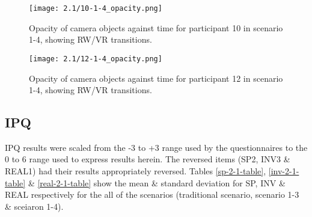 \begin{figure}[h]
	\begin{center}
	\texttt{[image: 2.1/10-1-4\_opacity.png]}
	\caption{Opacity of camera objects against time for participant 10 in scenario 1-4, showing RW/VR transitions.}
	\label{10-1-4_opacity.png}
	\end{center}
\end{figure}

\begin{figure}[h]
	\begin{center}
	\texttt{[image: 2.1/12-1-4\_opacity.png]}
	\caption{Opacity of camera objects against time for participant 12 in scenario 1-4, showing RW/VR transitions.}
	\label{12-1-4_opacity.png}
	\end{center}
\end{figure}

	







\subsection{IPQ}

IPQ results were scaled from the -3 to +3 range used by the questionnaires to the 0 to 6 range used to express results herein. The reversed items (SP2, INV3 \& REAL1) had their results appropriately reversed. Tables \ref{sp-2-1-table}, \ref{inv-2-1-table} \& \ref{real-2-1-table} show the mean \& standard deviation for SP, INV \& REAL respectively for the all of the scenarios (traditional scenario, scenario 1-3 \& sceiaron 1-4).

